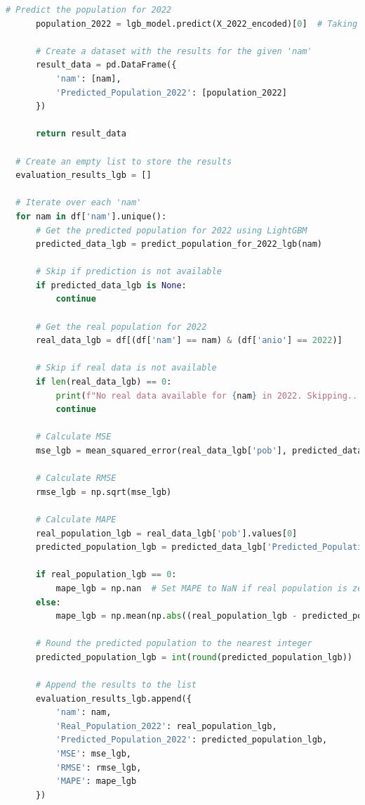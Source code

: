 \documentclass{article}
\theoremstyle{mytheoremstyle}
\theoremstyle{mytheoremstyle}
\theoremstyle{myproblemstyle}
\begin{document}
\begin{lstlisting}[language=Python, caption=LightGMB.ipynb,label={lst:LightGBM.ipynb}]
      # Predict the population for 2022
      population_2022 = lgb_model.predict(X_2022_encoded)[0]  # Taking the first prediction
      
      # Create a dataset with the results for the given 'nam'
      result_data = pd.DataFrame({
          'nam': [nam],
          'Predicted_Population_2022': [population_2022]
      })
      
      return result_data
  
  # Create an empty list to store the results
  evaluation_results_lgb = []
  
  # Iterate over each 'nam'
  for nam in df['nam'].unique():
      # Get the predicted population for 2022 using LightGBM
      predicted_data_lgb = predict_population_for_2022_lgb(nam)
      
      # Skip if prediction is not available
      if predicted_data_lgb is None:
          continue
      
      # Get the real population for 2022
      real_data_lgb = df[(df['nam'] == nam) & (df['anio'] == 2022)]
      
      # Skip if real data is not available
      if len(real_data_lgb) == 0:
          print(f"No real data available for {nam} in 2022. Skipping...")
          continue
      
      # Calculate MSE
      mse_lgb = mean_squared_error(real_data_lgb['pob'], predicted_data_lgb['Predicted_Population_2022'])
      
      # Calculate RMSE
      rmse_lgb = np.sqrt(mse_lgb)
      
      # Calculate MAPE
      real_population_lgb = real_data_lgb['pob'].values[0]
      predicted_population_lgb = predicted_data_lgb['Predicted_Population_2022'].values[0]
      
      if real_population_lgb == 0:
          mape_lgb = np.nan  # Set MAPE to NaN if real population is zero
      else:
          mape_lgb = np.mean(np.abs((real_population_lgb - predicted_population_lgb) / real_population_lgb)) * 100
      
      # Round the predicted population to the nearest integer
      predicted_population_lgb = int(round(predicted_population_lgb))
      
      # Append the results to the list
      evaluation_results_lgb.append({
          'nam': nam,
          'Real_Population_2022': real_population_lgb,
          'Predicted_Population_2022': predicted_population_lgb,
          'MSE': mse_lgb,
          'RMSE': rmse_lgb,
          'MAPE': mape_lgb
      })
  

\end{lstlisting}
\end{document}
